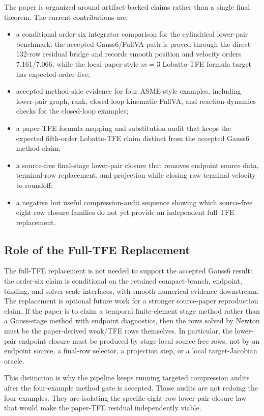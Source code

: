 \documentclass[11pt]{article}
\newcommand{\method}{Gauss6/FullVA}
\newcommand{\tfe}{TFE}
\begin{document}
The paper is organized around artifact-backed claims rather than a
single final theorem.  The current contributions are:
\begin{itemize}
  \item a conditional order-six integrator comparison for the cylindrical
  lower-pair benchmark: the accepted \method{} path is proved through the
  direct 132-row residual bridge and records smooth position and velocity
  orders 7.161/7.066, while the local paper-style $m=3$ Lobatto-\tfe{} formula
  target has expected order five;
  \item accepted method-side evidence for four ASME-style examples, including
  lower-pair graph, rank, closed-loop kinematic FullVA, and reaction-dynamics
  checks for the closed-loop examples;
  \item a paper-\tfe{} formula-mapping and substitution audit that keeps the
  expected fifth-order Lobatto-\tfe{} claim distinct from the accepted Gauss6
  method claim;
  \item a source-free final-stage lower-pair closure that removes endpoint
  source data, terminal-row replacement, and projection while closing raw
  terminal velocity to roundoff;
  \item a negative but useful compression-audit sequence showing which
  source-free eight-row closure families do not yet provide an independent
  full-\tfe{} replacement.
\end{itemize}

\subsection{Role of the Full-TFE Replacement}

The full-\tfe{} replacement is not needed to support the accepted Gauss6
result: the order-six claim is conditional on the retained compact-branch,
endpoint, binding, and solver-scale interfaces, with smooth numerical evidence
downstream.  The replacement is optional future work for a stronger
source-paper reproduction claim.  If the paper is to claim a temporal
finite-element stage method rather than a Gauss-stage method with endpoint
diagnostics, then the rows solved by Newton must be the paper-derived weak/TFE
rows themselves.  In particular, the lower-pair endpoint closure must be
produced by stage-local source-free rows, not by an endpoint source, a
final-row selector, a projection step, or a local target-Jacobian oracle.

This distinction is why the pipeline keeps running targeted compression audits
after the four-example method gate is accepted.  Those audits are not redoing
the four examples.  They are isolating the specific eight-row lower-pair
closure law that would make the paper-\tfe{} residual independently viable.
\end{document}
